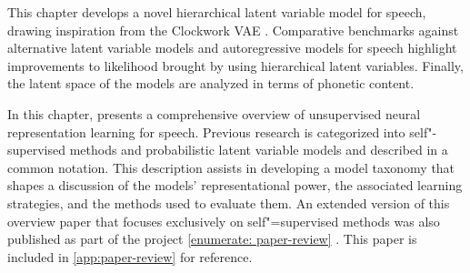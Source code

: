 This chapter develops a novel hierarchical latent variable model for speech, drawing inspiration from the Clockwork VAE \parencite{saxena_clockwork_2021}. Comparative benchmarks against alternative latent variable models and autoregressive models for speech highlight improvements to likelihood brought by using hierarchical latent variables. Finally, the latent space of the models are analyzed in terms of phonetic content.

In this chapter, presents a comprehensive overview of unsupervised neural representation learning for speech. Previous research is categorized into self"-supervised methods and probabilistic latent variable models and described in a common notation. This description assists in developing a model taxonomy that shapes a discussion of the models' representational power, the associated learning strategies, and the methods used to evaluate them.
An extended version of this overview paper that focuses exclusively on self"=supervised methods was also published as part of the project \ref{enumerate: paper-review} \parencite{mohamed_selfsupervised_2022}. This paper is included in \cref{app:paper-review} for reference.




